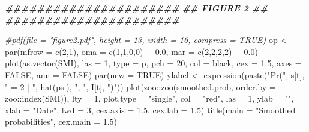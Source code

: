 \documentclass[
]{article}
\newenvironment{Shaded}{\begin{snugshade}}{\end{snugshade}}
\newcommand{\AttributeTok}[1]{\textcolor[rgb]{0.77,0.63,0.00}{#1}}
\newcommand{\CommentTok}[1]{\textcolor[rgb]{0.56,0.35,0.01}{\textit{#1}}}
\newcommand{\ConstantTok}[1]{\textcolor[rgb]{0.00,0.00,0.00}{#1}}
\newcommand{\DecValTok}[1]{\textcolor[rgb]{0.00,0.00,0.81}{#1}}
\newcommand{\DocumentationTok}[1]{\textcolor[rgb]{0.56,0.35,0.01}{\textbf{\textit{#1}}}}
\newcommand{\FloatTok}[1]{\textcolor[rgb]{0.00,0.00,0.81}{#1}}
\newcommand{\FunctionTok}[1]{\textcolor[rgb]{0.00,0.00,0.00}{#1}}
\newcommand{\NormalTok}[1]{#1}
\newcommand{\OtherTok}[1]{\textcolor[rgb]{0.56,0.35,0.01}{#1}}
\newcommand{\SpecialCharTok}[1]{\textcolor[rgb]{0.00,0.00,0.00}{#1}}
\newcommand{\StringTok}[1]{\textcolor[rgb]{0.31,0.60,0.02}{#1}}
\begin{document}
\begin{Shaded}
\begin{Highlighting}[]
\DocumentationTok{\#\#\#\#\#\#\#\#\#\#\#\#\#\#\#\#\#\#\#\#\#\#}
\DocumentationTok{\#\#     FIGURE 2     \#\#}
\DocumentationTok{\#\#\#\#\#\#\#\#\#\#\#\#\#\#\#\#\#\#\#\#\#\#}

\CommentTok{\#pdf(file = "figure2.pdf", height = 13, width = 16, compress = TRUE)}
\NormalTok{op }\OtherTok{\textless{}{-}} \FunctionTok{par}\NormalTok{(}\AttributeTok{mfrow =} \FunctionTok{c}\NormalTok{(}\DecValTok{2}\NormalTok{,}\DecValTok{1}\NormalTok{),}
          \AttributeTok{oma =} \FunctionTok{c}\NormalTok{(}\DecValTok{1}\NormalTok{,}\DecValTok{1}\NormalTok{,}\DecValTok{0}\NormalTok{,}\DecValTok{0}\NormalTok{) }\SpecialCharTok{+} \FloatTok{0.0}\NormalTok{,}
          \AttributeTok{mar =} \FunctionTok{c}\NormalTok{(}\DecValTok{2}\NormalTok{,}\DecValTok{2}\NormalTok{,}\DecValTok{2}\NormalTok{,}\DecValTok{2}\NormalTok{) }\SpecialCharTok{+} \FloatTok{0.0}\NormalTok{)}
\FunctionTok{plot}\NormalTok{(}\FunctionTok{as.vector}\NormalTok{(SMI), }\AttributeTok{las =} \DecValTok{1}\NormalTok{, }\AttributeTok{type =} \StringTok{\textquotesingle{}p\textquotesingle{}}\NormalTok{, }\AttributeTok{pch =} \DecValTok{20}\NormalTok{, }\AttributeTok{col =} \StringTok{\textquotesingle{}black\textquotesingle{}}\NormalTok{,}
     \AttributeTok{cex =} \FloatTok{1.5}\NormalTok{, }\AttributeTok{axes =} \ConstantTok{FALSE}\NormalTok{, }\AttributeTok{ann =} \ConstantTok{FALSE}\NormalTok{)}
\FunctionTok{par}\NormalTok{(}\AttributeTok{new =} \ConstantTok{TRUE}\NormalTok{)}
\NormalTok{ylabel }\OtherTok{\textless{}{-}} \FunctionTok{expression}\NormalTok{(}\FunctionTok{paste}\NormalTok{(}\StringTok{"Pr("}\NormalTok{, s[t], }\StringTok{" = 2 | "}\NormalTok{, }\FunctionTok{hat}\NormalTok{(psi), }\StringTok{", "}\NormalTok{, I[t], }\StringTok{")"}\NormalTok{))}
\FunctionTok{plot}\NormalTok{(zoo}\SpecialCharTok{::}\FunctionTok{zoo}\NormalTok{(smoothed.prob, }\AttributeTok{order.by =}\NormalTok{ zoo}\SpecialCharTok{::}\FunctionTok{index}\NormalTok{(SMI)), }\AttributeTok{lty =} \DecValTok{1}\NormalTok{, }\AttributeTok{plot.type =} \StringTok{"single"}\NormalTok{,}
     \AttributeTok{col =} \StringTok{"red"}\NormalTok{, }\AttributeTok{las =} \DecValTok{1}\NormalTok{, }\AttributeTok{ylab =} \StringTok{""}\NormalTok{, }\AttributeTok{xlab =} \StringTok{"Date"}\NormalTok{, }\AttributeTok{lwd =} \DecValTok{3}\NormalTok{, }\AttributeTok{cex.axis =} \FloatTok{1.5}\NormalTok{, }\AttributeTok{cex.lab =} \FloatTok{1.5}\NormalTok{)}
\FunctionTok{title}\NormalTok{(}\AttributeTok{main =} \StringTok{"Smoothed probabilities"}\NormalTok{, }\AttributeTok{cex.main =} \FloatTok{1.5}\NormalTok{)}

\end{Highlighting}
\end{Shaded}
\end{document}
